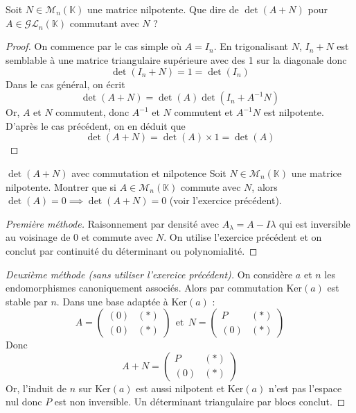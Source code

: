 \documentclass[french,a4paper]{article}
\newcommand{\K}{\mathbb{K}}
\newcommand{\inv}{^{-1}}
\renewcommand{\ker}{\text{Ker}}
\theoremstyle{plain}
\theoremstyle{definition}
\theoremstyle{remark}
\begin{document}
\begin{ex}{}
	Soit $N\in\mathcal{M}_n(\K)$ une matrice nilpotente. Que dire de $\det(A+N)$ pour $A\in\mathcal{GL}_n(\K)$ commutant avec $N$ ?
\end{ex}
\begin{proof}
	On commence par le cas simple où $A=I_n$. En trigonalisant $N$, $I_n+N$ est semblable à une matrice triangulaire supérieure avec des 1 sur la diagonale donc $$\det(I_n+N)=1=\det(I_n)$$ Dans le cas général, on écrit $$\det(A+N)=\det(A)\det(I_n+A\inv N)$$ Or, $A$ et $N$ commutent, donc $A\inv$ et $N$ commutent et $A\inv N$ est nilpotente. D'après le cas précédent, on en déduit que $$\det(A+N)=\det(A)\times 1=\det(A)$$ 
\end{proof}

\begin{ex}{$\det(A+N)$ avec commutation et nilpotence}
	Soit $N\in\mathcal{M}_n(\K)$ une matrice nilpotente. Montrer que si $A\in\mathcal{M}_n(\K)$ commute avec $N$, alors $\det(A)=0\implies\det(A+N)=0$ (voir l'exercice précédent).
\end{ex}
\begin{proof}[Première méthode]
	Raisonnement par densité avec $A_\lambda=A-I\lambda$ qui est inversible au voisinage de $0$ et commute avec $N$. On utilise l'exercice précédent et on conclut par continuité du déterminant ou polynomialité.
\end{proof}
\begin{proof}[Deuxième méthode (sans utiliser l'exercice précédent)]
	On considère $a$ et $n$ les endomorphismes canoniquement associés. Alors par commutation $\ker(a)$ est stable par $n$. Dans une base adaptée à $\ker(a)$ : $$A=\begin{pmatrix}
		(0)&(*)\\
		(0)&(*)
	\end{pmatrix}\ \ \text{et} \ \ N=\begin{pmatrix}
		P&(*)\\
		(0)&(*)
	\end{pmatrix}$$ Donc $$A+N=\begin{pmatrix}
		P&(*)\\
		(0)&(*)
	\end{pmatrix}$$ Or, l'induit de $n$ sur $\ker(a)$ est aussi nilpotent et $\ker(a)$ n'est pas l'espace nul donc $P$ est non inversible. Un déterminant triangulaire par blocs conclut.
\end{proof}
\end{document}

